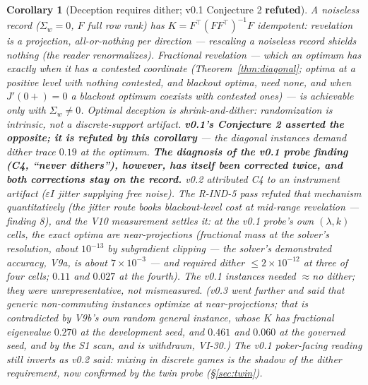 \documentclass[11pt]{article}
\newtheorem{corollary}{Corollary}
\theoremstyle{definition}
\begin{document}
\begin{corollary}[Deception requires dither; v0.1 Conjecture 2
\textbf{refuted}]\label{cor:dither}
A noiseless record ($\Sigma_w=0$, $F$ full row rank) has $K =
F^\top(FF^\top)^{-1}F$ \emph{idempotent}: revelation is a
projection, all-or-nothing per direction --- rescaling a noiseless
record shields nothing (the reader renormalizes). Fractional
revelation --- which an optimum has exactly when it has a contested
coordinate (Theorem~\ref{thm:diagonal}; optima at a positive level with
nothing contested, and blackout optima, need none, and when $J'(0+)=0$ a
blackout optimum coexists with contested ones) --- is achievable \emph{only} with
$\Sigma_w\neq0$. Optimal deception is shrink-\emph{and}-dither:
randomization is intrinsic, not a discrete-support artifact.
\textbf{v0.1's Conjecture 2 asserted the opposite; it is refuted by
this corollary} --- the diagonal instances demand dither trace $0.19$
at the optimum. \textbf{The diagnosis of the v0.1 probe finding (C4,
``never dithers''), however, has itself been corrected twice, and
both corrections stay on the record.} v0.2 attributed C4 to an
instrument artifact ($\varepsilon I$ jitter supplying free noise).
The R-IND-5 pass refuted that mechanism quantitatively (the jitter
route books blackout-level cost at mid-range revelation --- finding
8), and the V10 measurement settles it: at the v0.1 probe's own
$(\lambda,k)$ cells, the exact optima are \emph{near-projections}
(fractional mass at the solver's resolution, about $10^{-13}$ by
subgradient clipping --- the solver's demonstrated accuracy, V9a, is
about $7\times10^{-3}$ --- and required dither $\le 2\times
10^{-12}$ at three of four cells; $0.11$ and $0.027$ at the fourth).
The v0.1 instances needed $\approx$no dither; they were
\emph{unrepresentative}, not mismeasured. (v0.3 went further and said
that generic non-commuting instances optimize at near-projections;
that is contradicted by V9b's own random general instance, whose $K$
has fractional eigenvalue $0.270$ at the development seed, and $0.461$
and $0.060$ at the governed seed,
and by the S1 scan, and is withdrawn, VI-30.) The v0.1 poker-facing reading
still inverts as v0.2 said: mixing in discrete games is the shadow
of the dither requirement, now confirmed by the twin probe
(\S\ref{sec:twin}).
\end{corollary}
\end{document}
